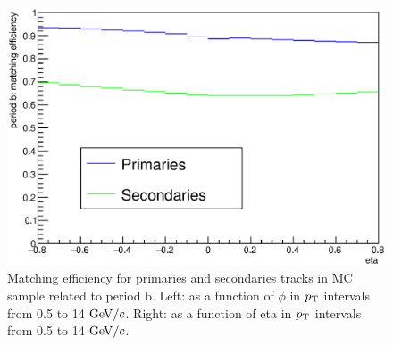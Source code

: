 \begin{enumerate}
\begin{figure}[!htb]
\begin{center}
\includegraphics[width=.49\textwidth]{FigCap4/eta_range_matcheff.eps}
\caption{Matching efficiency for primaries and secondaries tracks in MC sample related to  period b.  Left:  as a function of $\phi$ in $p_{\rm T}$ intervals from 0.5 to 14 $\mathrm{GeV}/c$. Right: as a function of eta in $p_{\rm T}$ intervals from 0.5 to 14 $\mathrm{GeV}/c$. }
\label{fig:matcheff_phieta}
\end{center}
\end{figure}



\end{enumerate}
